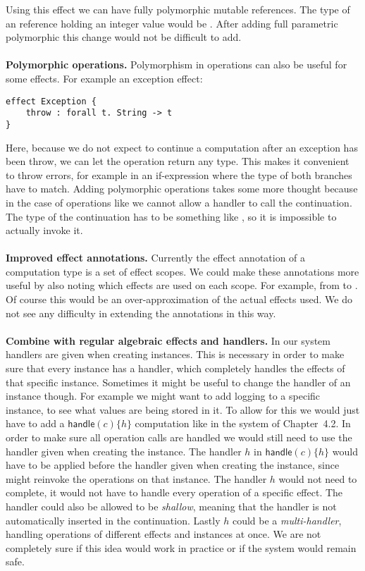 Using this effect we can have fully polymorphic mutable references.
The type of an reference holding an integer value would be .
After adding full parametric polymorphic this change would not be difficult to add.
\\\\
\textbf{Polymorphic operations.}
Polymorphism in operations can also be useful for some effects.
For example an exception effect:
\begin{verbatim}
effect Exception {
	throw : forall t. String -> t
}
\end{verbatim}
Here, because we do not expect to continue a computation after an exception has been throw, we can let the  operation return any type.
This makes it convenient to throw errors, for example in an if-expression where the type of both branches have to match.
Adding polymorphic operations takes some more thought because in the case of operations like  we cannot allow a handler to call the continuation. The type of the continuation has to be something like , so it is impossible to actually invoke it.
\\\\
\textbf{Improved effect annotations.}
Currently the effect annotation of a computation type is a set of effect scopes.
We could make these annotations more useful by also noting which effects are used on each scope.
For example, from  to .
Of course this would be an over-approximation of the actual effects used.
We do not see any difficulty in extending the annotations in this way.
\\\\
\textbf{Combine with regular algebraic effects and handlers.}
In our system handlers are given when creating instances.
This is necessary in order to make sure that every instance has a handler, which completely handles the effects of that specific instance.
Sometimes it might be useful to change the handler of an instance though.
For example we might want to add logging to a specific  instance, to see what values are being stored in it.
To allow for this we would just have to add a $\mathsf{handle} (c) \{ h \}$ computation like in the system of Chapter~4.2.
In order to make sure all operation calls are handled we would still need to use the handler given when creating the instance.
The handler $h$ in $\mathsf{handle} (c) \{ h \}$ would have to be applied before the handler given when creating the instance, since  might reinvoke the operations on that instance.
The handler $h$ would not need to complete, it would not have to handle every operation of a specific effect.
The handler could also be allowed to be \emph{shallow}, meaning that the handler is not automatically inserted in the continuation.
Lastly $h$ could be a \emph{multi-handler}, handling operations of different effects and instances at once.
We are not completely sure if this idea would work in practice or if the system would remain safe.
